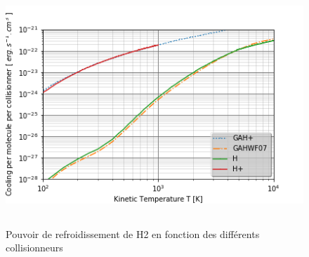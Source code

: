 \documentclass[10pt, a4paper]{report}
\numberwithin{equation}{subsection}
\begin{document}
\begin{figure}[]
\centering
\includegraphics[width=14.0cm,height=9cm]{CPfinal.png}
\caption{Pouvoir de refroidissement de H2 en fonction des différents collisionneurs}
\label{fig:CPfinal}
\end{figure}
\end{document}
